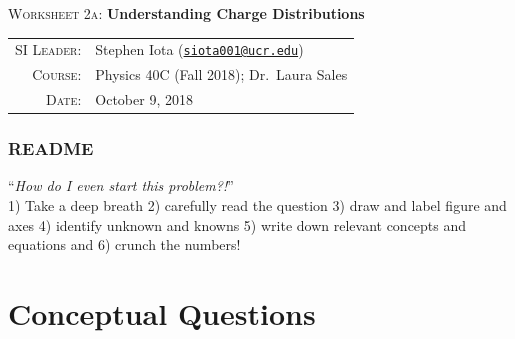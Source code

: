 \documentclass[12pt]{article}
\newcommand{\email}[1]{\texttt{\href{mailto:#1}{#1}}}
\begin{document}
\begin{center}

\Large{\textsc{Worksheet 2a}: \textbf{Understanding Charge Distributions}}

\end{center}

\vspace{.5mm}


\begin{tabular}{rl}
\textsc{SI Leader}:
&
Stephen Iota (\email{siota001@ucr.edu})
\\
\textsc{Course}:
&
Physics 40C (Fall 2018); Dr.~Laura Sales
\\
\textsc{Date}:
&
October 9, 2018
\end{tabular}


\subsubsection*{README}

``\textit{How do I even start this problem?!}''\\
1) Take a deep breath
2) carefully read the question
3) draw and label figure and axes
4) identify unknown and knowns
5) write down relevant concepts and equations and 
6) crunch the numbers!


\section{Conceptual Questions}
\end{document}

